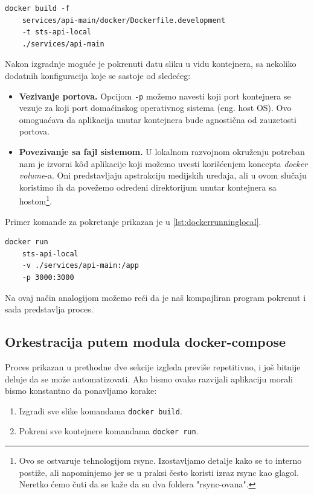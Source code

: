 \documentclass[12pt,oneside]{memoir}
\begin{document}
\newpage
\begin{lstlisting}[caption={Izgradnja slike}, label={lst:buildinglocal}]
docker build -f
    services/api-main/docker/Dockerfile.development 
    -t sts-api-local 
    ./services/api-main 
\end{lstlisting}

Nakon izgradnje moguće je pokrenuti datu sliku u vidu kontejnera, sa nekoliko dodatnih konfiguracija koje se sastoje od sledećeg:
\begin{itemize}
    \item \textbf{Vezivanje portova.} Opcijom \verb|-p| možemo navesti koji port kontejnera se vezuje za koji port domaćinskog operativnog sistema (eng. host OS). Ovo omoguaćava da aplikacija unutar kontejnera bude agnostična od zauzetosti portova.
    \item \textbf{Povezivanje sa fajl sistemom.} U lokalnom razvojnom okruženju potreban nam je izvorni k\^{o}d aplikacije koji možemo uvesti korišćenjem koncepta \textit{docker volume}-a. Oni predstavljaju apstrakciju medijskih uređaja, ali u ovom slučaju koristimo ih da povežemo određeni direktorijum unutar kontejnera sa hostom\footnote{Ovo se ostvaruje tehnologijom rsync. Izostavljamo detalje kako se to interno postiže, ali napominjemo jer se u praksi često koristi izraz rsync kao glagol. Neretko ćemo čuti da se kaže da su dva foldera "rsync-ovana".}.
\end{itemize}

Primer komande za pokretanje prikazan je u \ref{lst:dockerrunninglocal}.

\begin{lstlisting}[caption={Pokretanje kontejnera}, label={lst:dockerrunninglocal}]
docker run 
    sts-api-local 
    -v ./services/api-main:/app 
    -p 3000:3000
\end{lstlisting}

Na ovaj način analogijom možemo reći da je naš kompajliran program pokrenut i sada predstavlja proces.

\subsection{Orkestracija putem modula docker-compose}

Proces prikazan u prethodne dve sekcije izgleda previše repetitivno, i još bitnije deluje da se može automatizovati. Ako bismo ovako razvijali aplikaciju morali bismo konstantno da ponavljamo korake:
\begin{enumerate}
    \item Izgradi sve slike komandama \verb|docker build|.
    \item Pokreni sve kontejnere komandama \verb|docker run|.
\end{enumerate}
\end{document}

